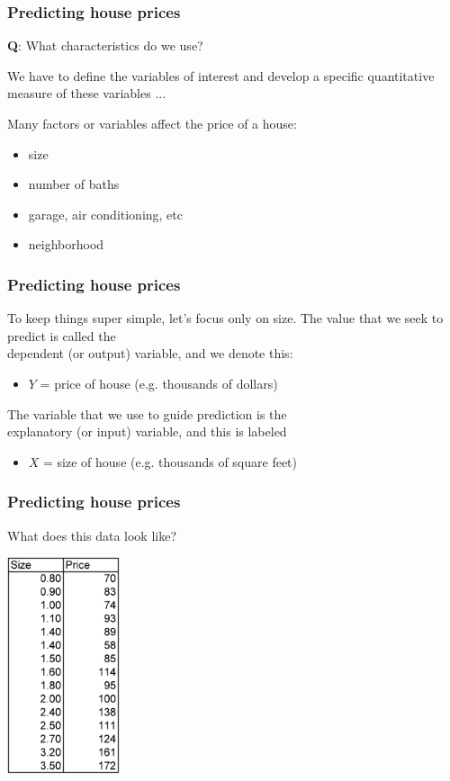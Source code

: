 \documentclass{beamer}
\newcommand{\bo}[1]{\textcolor{burntorange}{#1}}
\newcommand{\bl}{\color{lightblue}}
\newcommand{\rd}{\color{burntorange}}
\newcommand{\bk}{\color{black}}
\newcommand{\bi}{\begin{itemize}}
\newcommand{\ib}{\end{itemize}}
\newcommand{\p}{\item}
\newcommand{\sk}{\vspace{.5cm}}
\begin{document}
\begin{frame}
\frametitle{Predicting house prices} \vspace{-0.5cm}

\sk
\sk

\bl
{\bf Q}: What characteristics do we use?
\sk
\bk

\pause

We have to define the \bo{variables of interest} and 
develop a specific quantitative measure of these variables ...

\sk
Many factors or variables affect the price of a house:

\bi
\p size
\p number of baths
\p garage, air conditioning, etc
\p neighborhood 
\ib
\sk

\end{frame}

\begin{frame}
\frametitle{Predicting house prices} \vspace{-0.5cm}

\sk
To keep things super simple, let's focus only on size.
\sk
\sk
The value that we seek to predict is called the \\\rd dependent (or
output) \bk
variable, and we denote this:
\bi \p \bl $Y$ = price of house (e.g. thousands of dollars) \bk\ib

\sk

The variable that we use to guide prediction is the \\\rd 
explanatory (or input) \bk variable, and this is labeled
\bi \p  \bl $X$ = size of house (e.g. thousands of square feet)\bk\ib

\end{frame}

\begin{frame}
\frametitle{Predicting house prices} \vspace{-0.5cm}

What does this data look like?

\sk
\centering \includegraphics[width=1.3in]{figures/housedata}

\end{frame}
\end{document}
